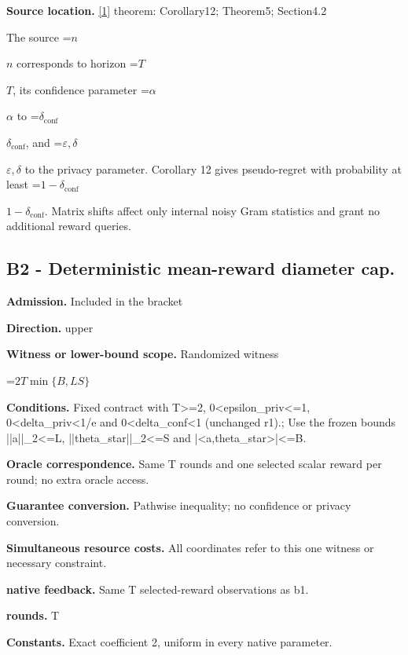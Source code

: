 \documentclass[10pt,a4paper]{article}
\newcommand{\AtlasMath}[1]{\par\begingroup\centering\setbox0=\hbox{$\displaystyle #1$}\ifdim\wd0>1.4\linewidth\typeout{ATLAS WIDE FORMULA: \the\wd0}\fi\ifdim\wd0>\linewidth\resizebox{\linewidth}{!}{\box0}\else\box0\fi\par\endgroup}
\newcommand{\AtlasInlineMath}[1]{\begingroup\setbox0=\hbox{$#1$}\ifdim\wd0>.4\linewidth\endgroup\AtlasMath{#1}\else\endgroup$#1$\fi}
\begin{document}
\textbf{Source location.} \href{https://arxiv.org/abs/1810.00068}{[1]} theorem: Corollary12; Theorem5; Section4.2

The source \AtlasInlineMath{n} corresponds to horizon \AtlasInlineMath{T}, its confidence parameter \AtlasInlineMath{\alpha} to \AtlasInlineMath{\delta_{\mathrm{conf}}}, and \AtlasInlineMath{\varepsilon,\delta} to the privacy parameter. Corollary 12 gives pseudo-regret with probability at least \AtlasInlineMath{1-\delta_{\mathrm{conf}}}. Matrix shifts affect only internal noisy Gram statistics and grant no additional reward queries.

\subsection{B2 - Deterministic mean-reward diameter cap.}
\textbf{Admission.} Included in the bracket

\textbf{Direction.} upper

\textbf{Witness or lower-bound scope.} Randomized witness

\AtlasMath{2T\min\{B,LS\}}
\textbf{Conditions.} Fixed contract with T>=2, 0<epsilon\_\allowbreak{}priv<=1, 0<delta\_\allowbreak{}priv<1/e and 0<delta\_\allowbreak{}conf<1 (unchanged r1).; Use the frozen bounds ||a||\_\allowbreak{}2<=L, ||theta\_\allowbreak{}star||\_\allowbreak{}2<=S and |<a,theta\_\allowbreak{}star>|<=B.

\textbf{Oracle correspondence.} Same T rounds and one selected scalar reward per round; no extra oracle access.

\textbf{Guarantee conversion.} Pathwise inequality; no confidence or privacy conversion.

\textbf{Simultaneous resource costs.} All coordinates refer to this one witness or necessary constraint.

\textbf{native feedback.} Same T selected-reward observations as b1.

\textbf{rounds.} T

\textbf{Constants.} Exact coefficient 2, uniform in every native parameter.
\end{document}
